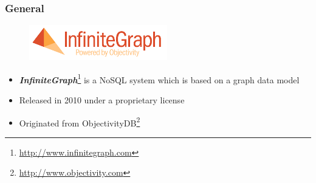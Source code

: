 
\begin{frame}
\frametitle{General}
\begin{figure}[htb]
 	\centering
  	\includegraphics[width=6cm]{images/logo}
\end{figure}
\begin{itemize}
	\item \emph{\textbf{InfiniteGraph}}\footnote{\url{http://www.infinitegraph.com}} is a NoSQL system which is based on a graph data model
	\item Released in 2010 under a proprietary license
	\item Originated from ObjectivityDB\footnote{\url{http://www.objectivity.com}}
\end{itemize}
\end{frame} 